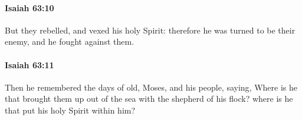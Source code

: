 		\paragraph{Isaiah 63:10} %
			\label{ISAIAH-63-10}

			But they rebelled, and vexed his holy Spirit: therefore he was turned to be their enemy, and he fought against them.


		\paragraph{Isaiah 63:11} %
			\label{ISAIAH-63-11}

			Then he remembered the days of old, Moses, and his people, saying, Where is he that brought them up out of the sea with the shepherd of his flock? where is he that put his holy Spirit within him?


